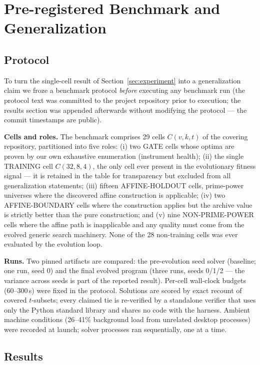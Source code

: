 \section{Pre-registered Benchmark and Generalization}\label{sec:benchmark}

\subsection{Protocol}

To turn the single-cell result of Section~\ref{sec:experiment} into a
generalization claim we froze a benchmark protocol \emph{before}
executing any benchmark run (the protocol text was committed to the
project repository prior to execution; the results section was
appended afterwards without modifying the protocol --- the commit
timestamps are public).

\textbf{Cells and roles.} The benchmark comprises 29 cells $C(v,k,t)$
of the covering repository, partitioned into five roles: (i) two
GATE cells whose optima are proven by our own exhaustive enumeration
(instrument health); (ii) the single TRAINING cell $C(32,8,4)$, the
only cell ever present in the evolutionary fitness signal --- it is
retained in the table for transparency but excluded from all
generalization statements; (iii) fifteen AFFINE-HOLDOUT cells,
prime-power universes where the discovered affine construction is
applicable; (iv) two AFFINE-BOUNDARY cells where the construction
applies but the archive value is strictly better than the pure
construction; and (v) nine NON-PRIME-POWER cells where the affine
path is inapplicable and any quality must come from the evolved
generic search machinery. None of the 28 non-training cells was ever
evaluated by the evolution loop.

\textbf{Runs.} Two pinned artifacts are compared: the pre-evolution
seed solver (baseline; one run, seed 0) and the final evolved program
(three runs, seeds 0/1/2 --- the variance across seeds is part of the
reported result). Per-cell wall-clock budgets (60--300\,s) were fixed
in the protocol. Solutions are scored by exact recount of covered
$t$-subsets; every claimed tie is re-verified by a standalone
verifier that uses only the Python standard library and shares no
code with the harness. Ambient machine conditions (26--41\%
background load from unrelated desktop processes) were recorded at
launch; solver processes ran sequentially, one at a time.

\subsection{Results}

